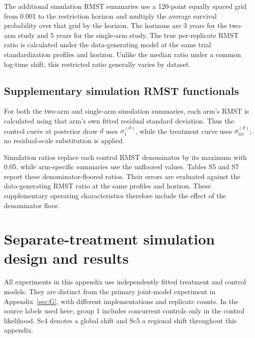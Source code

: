 \documentclass[11pt]{article}
\theoremstyle{remark}\newtheorem{remark}{Remark}[section]
\providecommand{\DIFaddtex}[1]{{\protect\color{blue} \sf #1}} %
\providecommand{\DIFaddbegin}{} %
\providecommand{\DIFaddend}{} %
\providecommand{\DIFadd}[1]{\texorpdfstring{\DIFaddtex{#1}}{#1}} %
\begin{document}
The additional simulation RMST summaries use a 120-point equally spaced grid from 0.001 to the restriction horizon and multiply the average survival probability over that grid by the horizon. The horizons are 3 years for the two-arm study and 5 years for the single-arm study. The true per-replicate RMST ratio is calculated under the data-generating model at the same trial standardization profiles and horizon. Unlike the median ratio under a common log-time shift, this restricted ratio generally varies by dataset.

\subsection{Supplementary simulation RMST functionals}\label{sec:D.5}
For both the two-arm and single-arm simulation summaries, each arm's RMST is calculated using that arm's own fitted residual standard deviation. Thus the control curve at posterior draw $d$ uses $\sigma_{1}^{(d)}$, while the treatment curve uses $\sigma_{\mathrm{trt}}^{(d)}$; no residual-scale substitution is applied.

Simulation ratios replace each control RMST denominator by its maximum with 0.05, while arm-specific summaries use the unfloored values. Tables S5 and S7 report these denominator-floored ratios. Their errors are evaluated against the data-generating RMST ratio at the same profiles and horizon. These supplementary operating characteristics therefore include the effect of the denominator floor.
 \section{ \DIFaddbegin \DIFadd{Separate-treatment simulation }\DIFaddend design and  results}\label{sec:E}
\DIFaddbegin \DIFadd{All experiments in this appendix use independently fitted treatment and control models. They are distinct from the primary joint-model experiment in Appendix~\ref{sec:G}, with different implementations and replicate counts. In the source labels used here, group 1 includes concurrent controls only in the control likelihood. Sc4 denotes a global shift and Sc5 a regional shift throughout this appendix.
}
\end{document}
